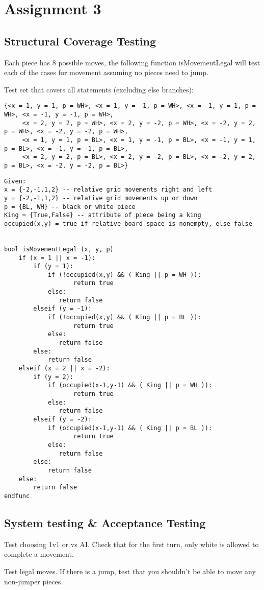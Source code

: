 \documentclass{article}
\begin{document}
\newpage

\section{Assignment 3}

\subsection{Structural Coverage Testing}


Each piece has 8 possible moves, the following function isMovementLegal will test each of the cases for movement assuming no pieces need to jump.

Test set that covers all statements (excluding else branches):
    \begin{lstlisting}[numbers=none,basicstyle=\tiny,frame=none]
     {<x = 1, y = 1, p = WH>, <x = 1, y = -1, p = WH>, <x = -1, y = 1, p = WH>, <x = -1, y = -1, p = WH>, 
     <x = 2, y = 2, p = WH>, <x = 2, y = -2, p = WH>, <x = -2, y = 2, p = WH>, <x = -2, y = -2, p = WH>,
     <x = 1, y = 1, p = BL>, <x = 1, y = -1, p = BL>, <x = -1, y = 1, p = BL>, <x = -1, y = -1, p = BL>,
     <x = 2, y = 2, p = BL>, <x = 2, y = -2, p = BL>, <x = -2, y = 2, p = BL>, <x = -2, y = -2, p = BL>}
    \end{lstlisting}
 
\begin{lstlisting}[style=CustomCSharpStyle,numbers=none]
Given:
x = {-2,-1,1,2} -- relative grid movements right and left
y = {-2,-1,1,2} -- relative grid movements up or down
p = {BL, WH} -- black or white piece
King = {True,False} -- attribute of piece being a king
occupied(x,y) = true if relative board space is nonempty, else false


bool isMovementLegal (x, y, p)
    if (x = 1 || x = -1):
        if (y = 1): 
            if (!occupied(x,y) && ( King || p = WH )):
                   return true
            else:
               return false
        elseif (y = -1):
            if (!occupied(x,y) && ( King || p = BL )):
                   return true
            else:
               return false
        else:
            return false
    elseif (x = 2 || x = -2):
        if (y = 2): 
            if (occupied(x-1,y-1) && ( King || p = WH )):
                   return true
            else:
               return false
        elseif (y = -2):
            if (occupied(x-1,y-1) && ( King || p = BL )):
                   return true
            else:
               return false
        else:
            return false
    else:
        return false
endfunc

\end{lstlisting}


\subsection{System testing \& Acceptance Testing}

Test choosing 1v1 or vs AI.
Check that for the first turn, only white is allowed to complete a movement.

Test legal moves. If there is a jump, test that you shouldn't be able to move any non-jumper pieces.
\end{document}
